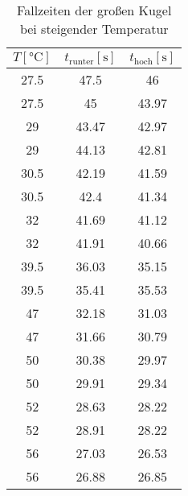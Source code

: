 \begin{table}[!htp]
  \centering
  \begin{tabular}{|c|c|c|}
    \hline
    $T [\unit{\degreeCelsius}]$ & $t_{\text{runter}} [\unit{\second}]$ & $t_{\text{hoch}} [\unit{\second}]$\\
    \hline \hline
    27.5 & 47.5 & 46\\%
    27.5 & 45 & 43.97\\
    29 & 43.47 & 42.97\\
    29 & 44.13 & 42.81\\
    30.5 & 42.19 & 41.59\\
    30.5 & 42.4 & 41.34\\
    32 & 41.69 & 41.12\\
    32 & 41.91 & 40.66\\
    39.5 & 36.03 & 35.15\\
    39.5 & 35.41 & 35.53\\
    47 & 32.18 & 31.03\\
    47 & 31.66 & 30.79\\
    50 & 30.38 & 29.97\\
    50 & 29.91 & 29.34\\
    52 & 28.63 & 28.22\\
    52 & 28.91 & 28.22\\
    56 & 27.03 & 26.53\\
    56 & 26.88 & 26.85\\
  \end{tabular}
  \label{tabellegkt}
  \caption{Fallzeiten der großen Kugel bei steigender Temperatur}
\end{table}


